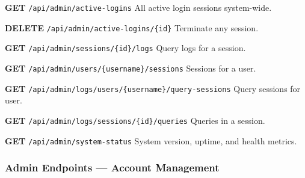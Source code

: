 \begin{tcolorbox}[colback=orange!5, colframe=orange!50, title=\textbf{Session and Audit Endpoints}]

\textbf{GET} \texttt{/api/admin/active-logins} \quad All active login sessions system-wide.

\vspace{0.2cm}

\textbf{DELETE} \texttt{/api/admin/active-logins/\{id\}} \quad Terminate any session.

\vspace{0.2cm}

\textbf{GET} \texttt{/api/admin/sessions/\{id\}/logs} \quad Query logs for a session.

\vspace{0.2cm}

\textbf{GET} \texttt{/api/admin/users/\{username\}/sessions} \quad Sessions for a user.

\vspace{0.2cm}

\textbf{GET} \texttt{/api/admin/logs/users/\{username\}/query-sessions} \quad Query sessions for user.

\vspace{0.2cm}

\textbf{GET} \texttt{/api/admin/logs/sessions/\{id\}/queries} \quad Queries in a session.

\vspace{0.2cm}

\textbf{GET} \texttt{/api/admin/system-status} \quad System version, uptime, and health metrics.

\end{tcolorbox}

\subsubsection{Admin Endpoints — Account Management}

